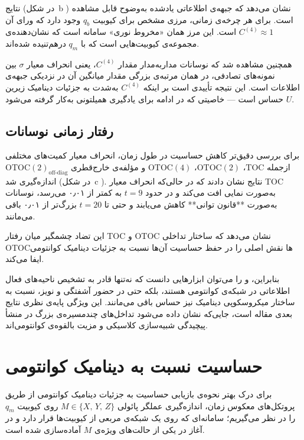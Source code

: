 نتایج (در شکل~b \lr{\ref{fig2}}) نشان می‌دهد که جبهه‌ی اطلاعاتی یادشده به‌وضوح قابل مشاهده است. برای هر چرخه‌ی زمانی، مرزی مشخص برای کیوبیت \( q_b \) وجود دارد که ورای آن \( C^{(4)} \approx 1 \) است. این مرز همان «مخروط نوری» سامانه است که نشان‌دهنده‌ی مجموعه‌ی کیوبیت‌هایی است که با \( q_m \) درهم‌تنیده شده‌اند.

همچنین مشاهده شد که نوسانات مدار‌به‌مدار مقدار \( C^{(4)} \)، یعنی انحراف معیار \(\sigma\) بین نمونه‌های تصادفی، در همان مرتبه‌ی بزرگی مقدار میانگین آن در نزدیکی جبهه‌ی اطلاعات است. این نتیجه تأییدی است بر اینکه \( C^{(4)} \) به‌شدت به جزئیات دینامیک زیرین \( U \) حساس است — خاصیتی که در ادامه برای یادگیری همیلتونی به‌کار گرفته می‌شود.

\subsection{رفتار زمانی نوسانات}

برای بررسی دقیق‌تر کاهش حساسیت در طول زمان، انحراف معیار کمیت‌های مختلفی ازجمله \(\mathrm{TOC}\)، \(\mathrm{OTOC(2)}\)، \(\mathrm{OTOC(4)}\) و مؤلفه‌ی خارج‌قطری \(\mathrm{OTOC(2)}_{\text{off-diag}}\) اندازه‌گیری شد (در شکل~c \lr{\ref{fig2}}).  
نتایج نشان دادند که در حالی‌که انحراف معیار TOC به‌صورت نمایی افت می‌کند و در حدود \(t = 9\) به کمتر از ۰٫۰۱ می‌رسد، نوسانات  به‌صورت **قانون توانی** کاهش می‌یابند و حتی تا \(t = 20\) بزرگ‌تر از ۰٫۰۱ باقی می‌مانند.

این تضاد چشمگیر میان رفتار TOC و OTOC نشان می‌دهد که ساختار تداخلی OTOCها نقش اصلی را در حفظ حساسیت آن‌ها نسبت به جزئیات دینامیک کوانتومی ایفا می‌کند.

بنابراین،  و  را می‌توان ابزارهایی دانست که نه‌تنها قادر به تشخیص ناحیه‌های فعال اطلاعاتی در شبکه‌ی کوانتومی هستند، بلکه حتی در حضور آشفتگی و نویز، نسبت به ساختار میکروسکوپی دینامیک نیز حساس باقی می‌مانند. این ویژگی پایه‌ی نظری نتایج بعدی مقاله است، جایی‌که نشان داده می‌شود تداخل‌های چندمسیره‌ی بزرگ در  منشأ پیچیدگی شبیه‌سازی کلاسیکی و مزیت بالقوه‌ی کوانتومی‌اند.

\section{حساسیت  نسبت به دینامیک کوانتومی}
\label{sec:sensitivity}

برای درک بهتر نحوه‌ی بازیابی حساسیت به جزئیات دینامیک کوانتومی از طریق پروتکل‌های معکوس زمان، اندازه‌گیری عملگر پائولی 
\( M \in \{X,\, Y,\, Z\} \) 
روی کیوبیت \( q_m \) را در نظر می‌گیریم؛ سامانه‌ای که روی یک شبکه‌ی مربعی از کیوبیت‌ها قرار دارد و در آغاز در یکی از حالت‌های ویژه‌ی \( M \) آماده‌سازی شده است. 

